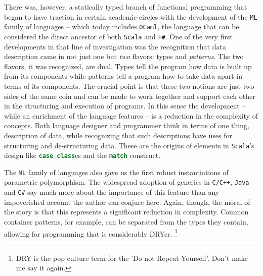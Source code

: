 There was, however, a statically typed branch of functional
programming that began to have traction in certain academic circles
with the development of the \texttt{ML} family of languages -- which
today includes \texttt{OCaml}, the language that can be considered the
direct ancestor of both \texttt{Scala} and \texttt{F\#}. One of the
very first developments in that line of investigation was the
recognition that data description came in not just one but \emph{two}
flavors: types and \emph{patterns}. The two flavors, it was
recognized, are dual. Types tell the program how data is built up
from its components while patterns tell a program how to take data
apart in terms of its components. The crucial point is that these two
notions are just two sides of the same coin and can be made to work
together and support each other in the structuring and execution of
programs. In this sense the development -- while an enrichment of the
language features -- is a reduction in the complexity of
concepts. Both language designer and programmer think in terms of one
thing, description of data, while recognizing that such descriptions
have uses for structuring and de-structuring data. These are the
origins of elements in \texttt{Scala}'s design like
\lstinline[language=Scala]!case class!es and the
\lstinline[language=Scala]!match! construct.

The \texttt{ML} family of languages also gave us the first robust
instantiations of parametric polymorphism. The widespread adoption of
generics in \texttt{C/C++}, \texttt{Java} and \texttt{C\#} say much
more about the importance of this feature than any impoverished
account the author can conjure here. Again, though, the moral of the
story is that this represents a significant reduction in
complexity. Common container patterns, for example, can be separated
from the types they contain, allowing for programming that is
considerably DRYer. \footnote{ DRY is the pop culture term for the 'Do
  not Repeat Yourself'. Don't make me say it again. }

